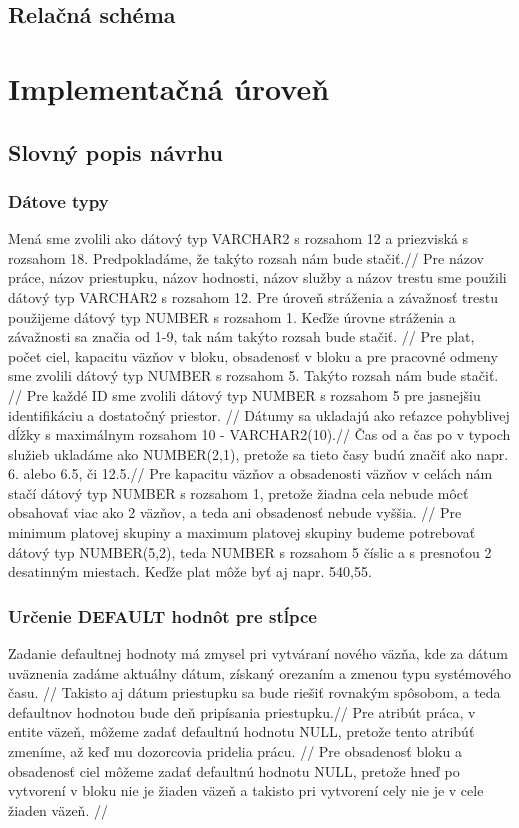 \documentclass[slovak, 12pt, Times New Roman]{article}
\begin{document}
		\subsection{Relačná schéma}	
	\section{Implementačná úroveň}
		\subsection{Slovný popis návrhu}
			\subsubsection{Dátove typy}
				Mená sme zvolili ako dátový typ VARCHAR2 s rozsahom 12 a priezviská s rozsahom 18. Predpokladáme, že takýto rozsah nám bude stačiť.//
				Pre názov práce, názov priestupku, názov hodnosti, názov služby a názov trestu sme použili dátový typ VARCHAR2 s rozsahom 12. 
				Pre úroveň stráženia a závažnosť trestu použijeme dátový typ NUMBER s rozsahom 1. Keďže úrovne stráženia a závažnosti sa značia od 1-9, tak nám takýto rozsah bude stačiť. //
				Pre plat, počet ciel, kapacitu väzňov v bloku, obsadenosť v bloku a pre pracovné odmeny sme zvolili dátový typ NUMBER s rozsahom 5. Takýto rozsah nám bude stačiť. //
				Pre každé ID sme zvolili dátový typ NUMBER s rozsahom 5 pre jasnejšiu identifikáciu a dostatočný priestor. //
				Dátumy sa ukladajú ako reťazce pohyblivej dĺžky s maximálnym rozsahom 10 - VARCHAR2(10).//
				Čas od a čas po v typoch služieb ukladáme ako NUMBER(2,1), pretože sa tieto časy budú značiť ako napr. 6. alebo 6.5, či 12.5.//
				Pre kapacitu väzňov a obsadenosti väzňov v celách nám stačí dátový typ NUMBER s rozsahom 1, pretože žiadna cela nebude môcť obsahovať viac ako 2 väzňov, a teda ani obsadenosť nebude vyššia. //
				Pre minimum platovej skupiny a maximum platovej skupiny budeme potrebovať dátový typ NUMBER(5,2), teda NUMBER s rozsahom 5 číslic a s presnoťou 2 desatinným miestach. Keďže plat môže byť aj napr. 540,55.
			\subsubsection{Určenie DEFAULT hodnôt pre stĺpce}
				Zadanie defaultnej hodnoty má zmysel pri vytváraní nového väzňa, kde za dátum uväznenia zadáme aktuálny dátum, získaný orezaním a zmenou typu systémového času. //
				Takisto aj dátum priestupku sa bude riešiť rovnakým spôsobom, a teda defaultnov hodnotou bude deň pripísania priestupku.// 
				Pre atribút práca, v entite väzeň, môžeme zadať defaultnú hodnotu NULL, pretože tento atribúť zmeníme, až keď mu dozorcovia pridelia prácu. //
				Pre obsadenosť bloku a obsadenosť ciel môžeme zadať defaultnú hodnotu NULL, pretože hneď po vytvorení v bloku nie je žiaden väzeň a takisto pri vytvorení cely nie je v cele žiaden väzeň. //
\end{document}

